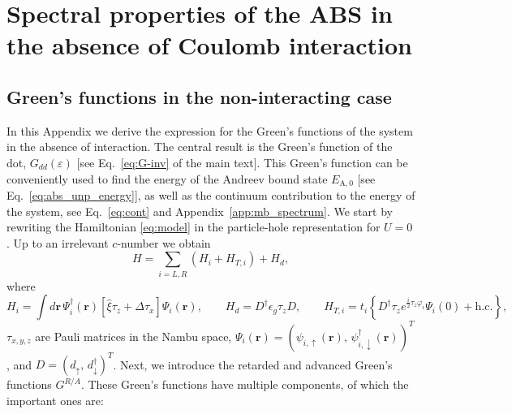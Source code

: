 \documentclass[aps,reprint,longbibliography, prb]{revtex4-2}
\begin{document}


\clearpage
\appendix

\widetext
\section{Spectral properties of the ABS in the absence of Coulomb interaction}
\label{app:non-int}

\subsection{Green's functions in the non-interacting case\label{app:gf}}
In this Appendix we derive the expression for the Green's functions of the system in the absence of interaction. The central result is the Green's function of the dot, $G_{dd}(\varepsilon)$ [see Eq.~\eqref{eq:G-inv} of the main text]. This Green's function can be conveniently used to find the energy of the Andreev bound state $E_\mathrm{A,0}$ [see Eq.~\eqref{eq:abs_unp_energy}], as well as the continuum contribution to the energy of the system, see Eq.~\eqref{eq:cont} and Appendix~\ref{app:mb_spectrum}. 
We start by rewriting the Hamiltonian \eqref{eq:model} in the particle-hole representation for $U = 0$. Up to an irrelevant $c$-number we obtain
\begin{equation}
\label{eq:ham-appendix}
    H = \sum_{i=L,R} \left(H_i+H_{T,i}\right) + H_d,
\end{equation}
where
\begin{equation}\label{eq:ham-appendix2}
    H_{i}	=\int d\mathbf{r}\,\Psi_{i}^{\dagger}(\mathbf{r})\left[\hat{\xi} \tau_z + \Delta \tau_x\right]
   \Psi_{i}(\mathbf{r}),\quad\quad
    H_{d} = D^{\dagger}\epsilon_g \tau_z D,\quad\quad H_{T,i}=t_{i}\left\{ D^{\dagger}\tau_{z}e^{\frac{i}{2}\tau_z\varphi_i}\Psi_{i}(0)+\mathrm{h.c.}\right\},
\end{equation}
$\tau_{x,y,z}$ are Pauli matrices in the Nambu space, $\Psi_i(\mathbf{r}) = (\psi_{i,\uparrow}(\mathbf{r}),\, \psi_{i,\downarrow}^{\dagger}(\mathbf{r}))^T$, and $D= (d_{\uparrow},\, d_{\downarrow}^{\dagger})^T$.
Next, we introduce the retarded and advanced  Green's functions $G^{R/A}$. These Green's functions have multiple components, of which the important ones are:
\end{document}
